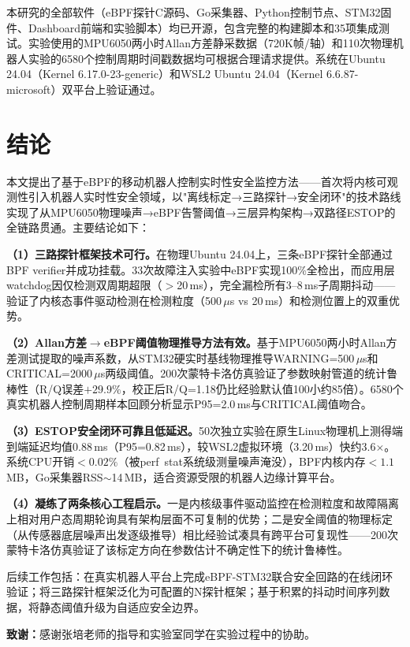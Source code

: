 \documentclass{rjthesis}
\begin{document}
本研究的全部软件（eBPF探针C源码、Go采集器、Python控制节点、STM32固件、Dashboard前端和实验脚本）均已开源，包含完整的构建脚本和35项集成测试。实验使用的MPU6050两小时Allan方差静采数据（720K帧/轴）和110次物理机器人实验的6580个控制周期时间戳数据均可根据合理请求提供。系统在Ubuntu 24.04（Kernel 6.17.0-23-generic）和WSL2 Ubuntu 24.04（Kernel 6.6.87-microsoft）双平台上验证通过。


\section{结论}

本文提出了基于eBPF的移动机器人控制实时性安全监控方法——首次将内核可观测性引入机器人实时性安全领域，以"离线标定→三路探针→安全闭环"的技术路线实现了从MPU6050物理噪声→eBPF告警阈值→三层异构架构→双路径ESTOP的全链路贯通。主要结论如下：

\textbf{（1）三路探针框架技术可行。}在物理Ubuntu 24.04上，三条eBPF探针全部通过BPF verifier并成功挂载。33次故障注入实验中eBPF实现100\%全检出，而应用层watchdog因仅检测双周期超限（$>$20\,ms），完全漏检所有3--8\,ms子周期抖动——验证了内核态事件驱动检测在检测粒度（500\,$\mu$s vs 20\,ms）和检测位置上的双重优势。

\textbf{（2）Allan方差$\to$eBPF阈值物理推导方法有效。}基于MPU6050两小时Allan方差测试提取的噪声系数，从STM32硬实时基线物理推导WARNING=500\,$\mu$s和CRITICAL=2000\,$\mu$s两级阈值。200次蒙特卡洛仿真验证了参数映射管道的统计鲁棒性（R/Q误差$+29.9\%$，校正后R/Q=1.18仍比经验默认值100小约85倍）。6580个真实机器人控制周期样本回顾分析显示P95=2.0\,ms与CRITICAL阈值吻合。

\textbf{（3）ESTOP安全闭环可靠且低延迟。}50次独立实验在原生Linux物理机上测得端到端延迟均值0.88\,ms（P95=0.82\,ms），较WSL2虚拟环境（3.20\,ms）快约3.6$\times$。系统CPU开销$<0.02\%$（被perf~stat系统级测量噪声淹没），BPF内核内存$<1.1$\,MB，Go采集器RSS$\sim$14\,MB，适合资源受限的机器人边缘计算平台。

\textbf{（4）凝练了两条核心工程启示。}一是内核级事件驱动监控在检测粒度和故障隔离上相对用户态周期轮询具有架构层面不可复制的优势；二是安全阈值的物理标定（从传感器底层噪声出发逐级推导）相比经验试凑具有跨平台可复现性——200次蒙特卡洛仿真验证了该标定方向在参数估计不确定性下的统计鲁棒性。

后续工作包括：在真实机器人平台上完成eBPF-STM32联合安全回路的在线闭环验证；将三路探针框架泛化为可配置的N探针框架；基于积累的抖动时间序列数据，将静态阈值升级为自适应安全边界。

\vspace{1em}
\noindent\textbf{致谢：}感谢张培老师的指导和实验室同学在实验过程中的协助。
\end{document}
